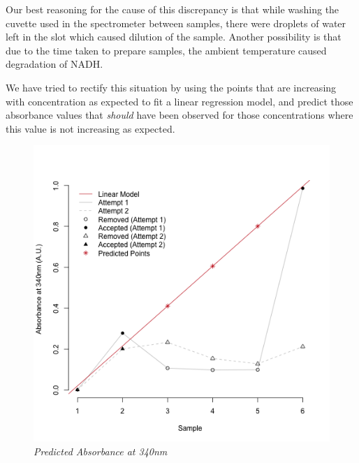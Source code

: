 \documentclass[a4paper,10pt]{article}
\begin{document}
            Our best reasoning for the cause of this discrepancy is that while washing the cuvette
            used in the spectrometer between samples, there were droplets of water left in the 
            slot which caused dilution of the sample.
            Another possibility is that due to the time taken to prepare samples, the ambient 
            temperature caused degradation of NADH.

            We have tried to rectify this situation by using the points that are increasing with
            concentration as expected to fit a linear regression model, and predict those absorbance
            values that {\it should} have been observed for those concentrations where this value is
            not increasing as expected.

            \begin{minipage}{0.49\textwidth}
                \begin{figure}[H]
                    \centering
                    \caption{\it Predicted Absorbance at 340nm}\label{fig:abs_340_pred}
                    \includegraphics[width=\textwidth]{../resources/absorption_340_pred.png}
                \end{figure}
            \end{minipage}
            \hspace{0.01\textwidth}
\end{document}
